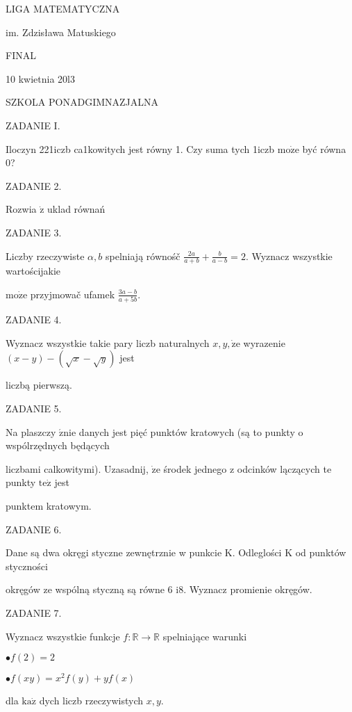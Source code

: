\documentclass[a4paper,12pt]{article}
\begin{document}
LIGA MATEMATYCZNA

im. Zdzisława Matuskiego

FINAL

10 kwietnia 20l3

SZKOLA PONADGIMNAZJALNA

ZADANIE I.

Iloczyn 221iczb ca1kowitych jest równy 1. Czy suma tych 1iczb $\mathrm{m}\mathrm{o}\dot{\mathrm{z}}\mathrm{e}$ być równa 0?

ZADANIE 2.

Rozwia $\dot{\mathrm{z}}$ uklad równań 

ZADANIE 3.

Liczby rzeczywiste $\alpha, b$ spelniają równośč $\displaystyle \frac{2a}{a+b}+\frac{b}{a-b}=2$. Wyznacz wszystkie wartościjakie

$\mathrm{m}\mathrm{o}\dot{\mathrm{z}}\mathrm{e}$ przyjmowač ufamek $\displaystyle \frac{3a-b}{a+5b}.$

ZADANIE 4.

Wyznacz wszystkie takie pary liczb naturalnych $x, y, \dot{\mathrm{z}}\mathrm{e}$ wyrazenie $(x-y)-(\sqrt{x}-\sqrt{y})$ jest

liczbą pierwszą.

ZADANIE 5.

Na plaszczy $\acute{\mathrm{z}}\mathrm{n}\mathrm{i}\mathrm{e}$ danych jest pięć punktów kratowych (są to punkty o wspólrzędnych będących

liczbami calkowitymi). Uzasadnij, $\dot{\mathrm{z}}\mathrm{e}$ środek jednego z odcinków lączących te punkty $\mathrm{t}\mathrm{e}\dot{\mathrm{z}}$ jest

punktem kratowym.

ZADANIE 6.

Dane są dwa okręgi styczne zewnętrznie w punkcie K. Odleglości K od punktów styczności

okręgów ze wspólną styczną są równe 6 i8. Wyznacz promienie okręgów.

ZADANIE 7.

Wyznacz wszystkie funkcje $f:\mathbb{R}\rightarrow \mathbb{R}$ spelniające warunki

$\bullet f(2)=2$

$\bullet f(xy)=x^{2}f(y)+yf(x)$

dla $\mathrm{k}\mathrm{a}\dot{\mathrm{z}}$ dych liczb rzeczywistych $x, y.$
\end{document}
